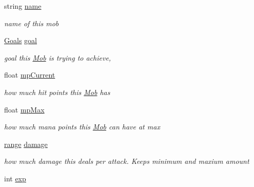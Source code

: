 \begin{DoxyCompactItemize}
\item 
string \hyperlink{class_mob_a1adcb405b2a4647bfb2471b1283b9477}{name}\hypertarget{class_mob_a1adcb405b2a4647bfb2471b1283b9477}{}\label{class_mob_a1adcb405b2a4647bfb2471b1283b9477}

\begin{DoxyCompactList}\small\item\em name of this mob \end{DoxyCompactList}\item 
\hyperlink{class_mob_a886346a9f913203df0797f2c84dd8962}{Goals} \hyperlink{class_mob_ad6c2e1b70a39551fd39b25002dac55b1}{goal}
\begin{DoxyCompactList}\small\item\em goal this \hyperlink{class_mob}{Mob} is trying to achieve, \end{DoxyCompactList}\item 
float \hyperlink{class_mob_ae1388056fe541060e8c1607ae561801f}{mp\+Current}\hypertarget{class_mob_ae1388056fe541060e8c1607ae561801f}{}\label{class_mob_ae1388056fe541060e8c1607ae561801f}

\begin{DoxyCompactList}\small\item\em how much hit points this \hyperlink{class_mob}{Mob} has \end{DoxyCompactList}\item 
float \hyperlink{class_mob_a8156e952a713baa462990ce635bf9ae8}{mp\+Max}\hypertarget{class_mob_a8156e952a713baa462990ce635bf9ae8}{}\label{class_mob_a8156e952a713baa462990ce635bf9ae8}

\begin{DoxyCompactList}\small\item\em how much mana points this \hyperlink{class_mob}{Mob} can have at max \end{DoxyCompactList}\item 
\hyperlink{structrange}{range} \hyperlink{class_mob_aa3ee5454e028e23885b78c4afe880a77}{damage}\hypertarget{class_mob_aa3ee5454e028e23885b78c4afe880a77}{}\label{class_mob_aa3ee5454e028e23885b78c4afe880a77}

\begin{DoxyCompactList}\small\item\em how much damage this deals per attack. Keeps minimum and maxium amount \end{DoxyCompactList}\item 
int \hyperlink{class_mob_a30bc4209cc6c6294cd3c68943317e682}{exp}\hypertarget{class_mob_a30bc4209cc6c6294cd3c68943317e682}{}\label{class_mob_a30bc4209cc6c6294cd3c68943317e682}


\end{DoxyCompactItemize}
